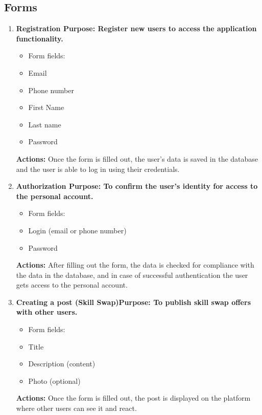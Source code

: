 \subsection{Forms}\label{forms}
\begin{enumerate}
    \item \textbf{Registration Purpose: Register new users to access the application functionality.}
\begin{itemize}
    \item Form fields:
    \item Email
    \item Phone number
    \item First Name
    \item Last name
    \item Password
\end{itemize}
\textbf{Actions:} Once the form is filled out, the user's data is saved in the database and the user is able to log in using their credentials.

\par
\vspace{0.5cm}

\item \textbf{Authorization Purpose: To confirm the user's identity for access to the personal account.}
\begin{itemize}
\item Form fields:
\item Login (email or phone number)
\item Password
\end{itemize}
\textbf{Actions:} After filling out the form, the data is checked for compliance with the data in the database, and in case of successful authentication the user gets access to the personal account.

\par
\vspace{0.5cm}

\item \textbf{Creating a post (Skill Swap)Purpose: To publish skill swap offers with other users.}
\begin{itemize}
    \item Form fields:
    \item Title
    \item Description (content)
    \item Photo (optional)
\end{itemize}
\textbf{Actions:} Once the form is filled out, the post is displayed on the platform where other users can see it and react.


\end{enumerate}
